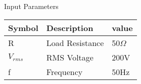 \setlength{\arrayrulewidth}{0.3mm}
\setlength{\tabcolsep}{12pt}
\renewcommand{\arraystretch}{1.3}


\begin{center}
\caption{Input Parameters}
\begin{tabular}{ |p{1.7cm}|p{1.7cm}|p{1.7cm}|  }

\hline
 {Symbol}&{Description} & {value}\\
\hline
R & Load Resistance & 50$\Omega$\\
\hline
$V_{rms}$ & RMS Voltage  & 200V\\
\hline
f & Frequency & 50Hz \\
\hline

\end{tabular}
\end{center}
